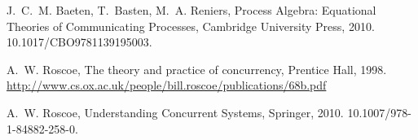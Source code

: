 \documentclass[GCNS]{yincog}
\theoremstyle{remark}
\theoremstyle{theorem}
\theoremstyle{remark}
\begin{document}
\begin{backmatter}
\begin{thebibliography}{}
\begin{bsubitem}
\begin{bcontribution}%
\end{bcontribution}
\begin{bhost}
\begin{bbook}
\end{bbook}
\end{bhost}
\end{bsubitem}
%
\OrigBibText
J.~C.~M. Baeten, T.~Basten, M.~A. Reniers, Process Algebra: Equational
Theories of Communicating Processes, Cambridge University Press, 2010.
10.1017/CBO9781139195003.
\endOrigBibText
{}%
\endbibitem

\begin{bsubitem}
\begin{bcontribution}%
\end{bcontribution}
\begin{bhost}
\begin{bbook}%
\end{bbook}
\end{bhost}
\begin{bhost}
\begin{behost}
\end{behost}
\end{bhost}
\end{bsubitem}
%
\OrigBibText
A.~W. Roscoe,
{The
theory and practice of concurrency}, {Prentice Hall}, 1998.
\url{http://www.cs.ox.ac.uk/people/bill.roscoe/publications/68b.pdf}
\endOrigBibText
{}%
\endbibitem

\begin{bsubitem}
\begin{bcontribution}%
\end{bcontribution}
\begin{bhost}
\begin{bbook}
\end{bbook}
\end{bhost}
\end{bsubitem}
%
\OrigBibText
A.~W. Roscoe, Understanding Concurrent Systems, Springer, 2010.
10.1007/978-1-84882-258-0.
\endOrigBibText
{}%
\endbibitem


\end{thebibliography}
\end{backmatter}
\end{document}

